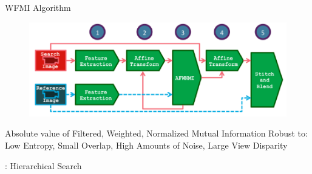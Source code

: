 \documentclass[serif]{beamer}
\begin{document}
\begin{frame}[c]{\sc WFMI Algorithm}

\begin{figure}
\centering
\includegraphics[width=1\columnwidth]{flowchartHorizontal.png}
\label{Flowchart}
\end{figure}

\begin{block}{\footnotesize {\color{yellow}A}bsolute value of {\color{yellow}F}iltered, {\color{yellow}W}eighted, {\color{yellow}N}ormalized {\color{yellow}M}utual {\color{yellow}I}nformation}
Robust to: Low Entropy, Small Overlap, High Amounts of Noise, Large View Disparity
\end{block}


\end{frame}


\begin{frame}[c]{: Hierarchical Search}







\end{frame}
\end{document}
